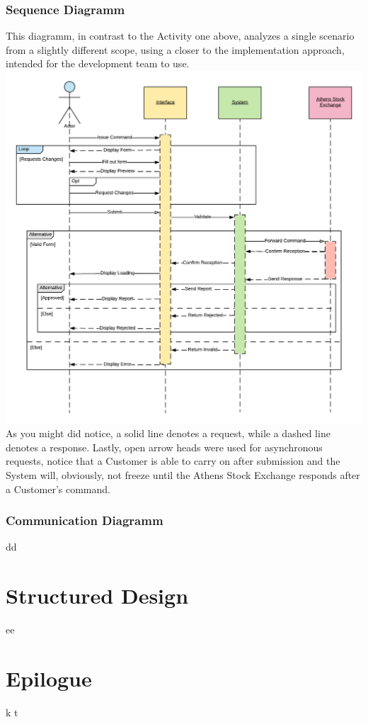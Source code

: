 \documentclass{article}
\begin{document}
\subsubsection{Sequence Diagramm}
This diagramm, in contrast to the Activity one above, analyzes a single scenario from a slightly different scope, using a closer to the implementation approach, intended for the development team to use.\\ 
\includegraphics[scale=0.25]{sequence}
As you might did notice, a solid line denotes a request, while a dashed line denotes a response. Lastly, open arrow heads were used for asynchronous requests, notice that a Customer is able to carry on after submission and the System will, obviously, not freeze until the Athens Stock Exchange responds after a Customer's command.

\newpage
\subsubsection{Communication Diagramm}
dd

\newpage
\section{Structured Design}
ee


\section{Epilogue}
k t     
\end{document}
